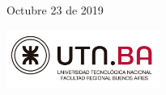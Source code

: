 \begin{titlepage}
	
	\vfill\vfill\vfill %
	{\large Octubre 23 de 2019} %

	\vfill
	\includegraphics[width=50mm]{./imagenes/Logo_UTN.png}\\[1cm] %
\end{titlepage}

% 

